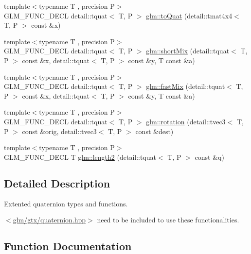 \begin{DoxyCompactItemize}
\item 
{\footnotesize template$<$typename T , precision P$>$ }\\G\+L\+M\+\_\+\+F\+U\+N\+C\+\_\+\+D\+E\+CL detail\+::tquat$<$ T, P $>$ \hyperlink{group__gtx__quaternion_gab2e47ea15791ee85dfacfd9e952bad64}{glm\+::to\+Quat} (detail\+::tmat4x4$<$ T, P $>$ const \&x)
\item 
{\footnotesize template$<$typename T , precision P$>$ }\\G\+L\+M\+\_\+\+F\+U\+N\+C\+\_\+\+D\+E\+CL detail\+::tquat$<$ T, P $>$ \hyperlink{group__gtx__quaternion_ga297f92682708e59bda1849ca3aad0fea}{glm\+::short\+Mix} (detail\+::tquat$<$ T, P $>$ const \&x, detail\+::tquat$<$ T, P $>$ const \&y, T const \&a)
\item 
{\footnotesize template$<$typename T , precision P$>$ }\\G\+L\+M\+\_\+\+F\+U\+N\+C\+\_\+\+D\+E\+CL detail\+::tquat$<$ T, P $>$ \hyperlink{group__gtx__quaternion_ga5d1bb2670d0c73fff5912134ba7c024c}{glm\+::fast\+Mix} (detail\+::tquat$<$ T, P $>$ const \&x, detail\+::tquat$<$ T, P $>$ const \&y, T const \&a)
\item 
{\footnotesize template$<$typename T , precision P$>$ }\\G\+L\+M\+\_\+\+F\+U\+N\+C\+\_\+\+D\+E\+CL detail\+::tquat$<$ T, P $>$ \hyperlink{group__gtx__quaternion_ga964b26fdcd9f6f694c1003b0571092a6}{glm\+::rotation} (detail\+::tvec3$<$ T, P $>$ const \&orig, detail\+::tvec3$<$ T, P $>$ const \&dest)
\item 
{\footnotesize template$<$typename T , precision P$>$ }\\G\+L\+M\+\_\+\+F\+U\+N\+C\+\_\+\+D\+E\+CL T \hyperlink{group__gtx__quaternion_gaac8d704c7dfac92835109953b88f1c92}{glm\+::length2} (detail\+::tquat$<$ T, P $>$ const \&q)
\end{DoxyCompactItemize}


\subsection{Detailed Description}
Extented quaternion types and functions. 

$<$\hyperlink{gtx_2quaternion_8hpp}{glm/gtx/quaternion.\+hpp}$>$ need to be included to use these functionalities. 

\subsection{Function Documentation}
